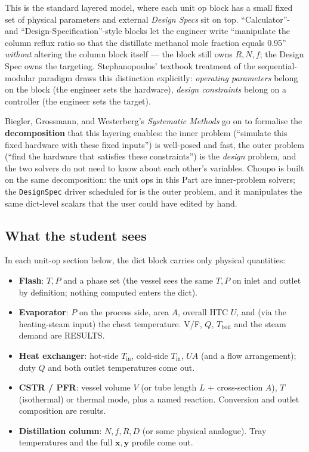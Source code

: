 \documentclass[11pt,a4paper]{article}
\newcommand{\xv}{\mathbf{x}}
\newcommand{\yv}{\mathbf{y}}
\begin{document}
This is the standard layered model, where each unit op block has a small fixed set of
physical parameters and external \emph{Design Specs} sit on top.
``Calculator''- and ``Design-Specification''-style blocks
let the engineer write ``manipulate the
column reflux ratio so that the distillate methanol mole
fraction equals 0.95'' \emph{without} altering the column block
itself --- the block still owns $R, N, f$; the Design Spec owns
the targeting.  Stephanopoulos' textbook treatment of the
sequential-modular paradigm \cite{Stephanopoulos1988} draws this
distinction explicitly: \emph{operating parameters} belong on
the block (the engineer sets the hardware), \emph{design
constraints} belong on a controller (the engineer sets the
target).

Biegler, Grossmann, and Westerberg's \emph{Systematic Methods}
\cite{BieglerGrossmannWesterberg1997} go on to formalise the
\textbf{decomposition} that this layering enables: the inner
problem (``simulate this fixed hardware with these fixed
inputs'') is well-posed and fast, the outer problem (``find the
hardware that satisfies these constraints'') is the
\emph{design} problem, and the two solvers do not need to know
about each other's variables.  Choupo is built on the same
decomposition: the unit ops in this Part are inner-problem
solvers; the \texttt{DesignSpec} driver scheduled for is
the outer problem, and it manipulates the same dict-level
scalars that the user could have edited by hand.

\subsection{What the student sees}

In each unit-op section below, the dict block carries only
physical quantities:

\begin{itemize}[leftmargin=*,nosep,topsep=2pt]
  \item \textbf{Flash}: $T, P$ and a phase set (the vessel sees
        the same $T, P$ on inlet and outlet by definition;
        nothing computed enters the dict).
  \item \textbf{Evaporator}: $P$ on the process side, area $A$,
        overall HTC $U$, and (via the heating-steam input) the
        chest temperature.  V/F, $Q$, $T_{\!\mathrm{boil}}$ and
        the steam demand are RESULTS.
  \item \textbf{Heat exchanger}: hot-side $T_{\mathrm{in}}$,
        cold-side $T_{\mathrm{in}}$, $UA$ (and a flow
        arrangement); duty $Q$ and both outlet temperatures
        come out.
  \item \textbf{CSTR / PFR}: vessel volume $V$ (or tube length
        $L$ + cross-section $A$), $T$ (isothermal) or thermal
        mode, plus a named reaction.  Conversion and outlet
        composition are results.
  \item \textbf{Distillation column}: $N, f, R, D$ (or some
        physical analogue).  Tray temperatures and the full
        $\xv, \yv$ profile come out.
\end{itemize}
\end{document}

